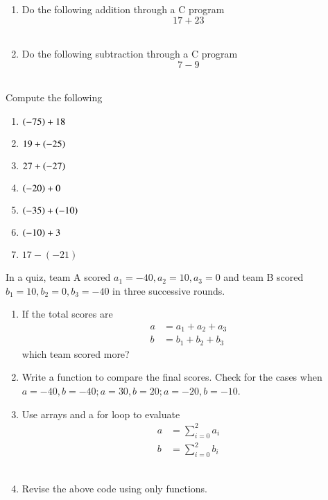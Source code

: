 \begin{enumerate}[label=\thesubsection.\arabic*, ref=\thesubsection.\theenumi]
\item Do the following addition through a C program
	$$17+23$$
	\\
	\solution
	
\item Do the following subtraction through a C program
$$7-9$$
	\\
	\solution
	
\end{enumerate}
Compute the following
\begin{enumerate}[label=\thesubsection.\arabic*, ref=\thesubsection.\theenumi,resume*]
\item $\left(-75\right)+18$
\item $19+\left(-25\right)$
\item $27+\left(-27\right)$
\item $\left(-20\right)+0$
\item $\left(-35\right)+\left(-10\right)$
\item $\left(-10\right)+3$
\item $17-(-21)$
\end{enumerate}
In a quiz, team A scored $a_1 = -40, a_2=10, a_3=0$ and team B scored $b_1=10, b_2=0, b_3=-40$ in three successive rounds.
\begin{enumerate}[label=\thesubsection.\arabic*, ref=\thesubsection.\theenumi,resume*]
\item  If the total scores are 
	\begin{align}
		a &= a_1+a_2+a_3
		\\
		b &= b_1+b_2+b_3
	\end{align}
	which team scored more? 
	\\
	\solution 
	
\item Write a function to compare the final scores.  Check for the cases when $a = -40, b = -40; a = 30, b = 20; a = -20, b = -10$.
	\\
	\solution 
	
\item Use arrays and a for loop to evaluate 
	\begin{align}
		a &= \sum_{i=0}^{2}a_i
		\\
		b &= \sum_{i=0}^{2}b_i
	\end{align}
	\\
	\solution 
	
\item Revise the above code using only functions.
\end{enumerate}

